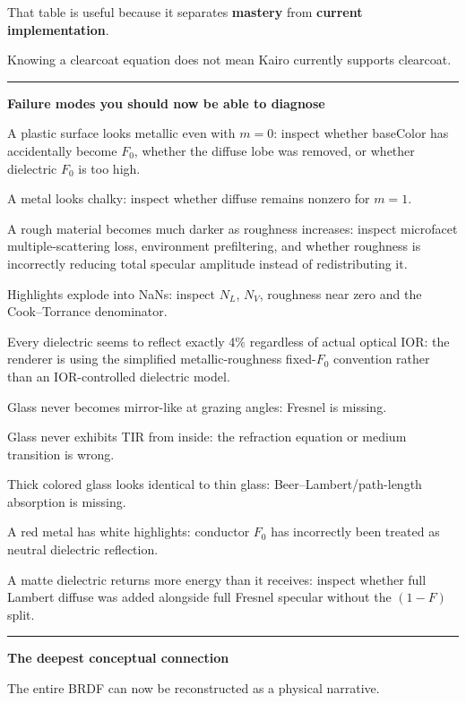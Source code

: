 That table is useful because it separates \textbf{mastery} from \textbf{current implementation}.

Knowing a clearcoat equation does not mean Kairo currently supports clearcoat.

\begin{center}\rule{0.5\linewidth}{0.5pt}\end{center}

\textbf{Failure modes you should now be able to diagnose}

A plastic surface looks metallic even with \(m=0\): inspect whether baseColor has accidentally become \(F_0\), whether the diffuse lobe was removed, or whether dielectric \(F_0\) is too high.

A metal looks chalky: inspect whether diffuse remains nonzero for \(m=1\).

A rough material becomes much darker as roughness increases: inspect microfacet multiple-scattering loss, environment prefiltering, and whether roughness is incorrectly reducing total specular amplitude instead of redistributing it.

Highlights explode into NaNs: inspect \(N_L\), \(N_V\), roughness near zero and the Cook--Torrance denominator.

Every dielectric seems to reflect exactly 4\% regardless of actual optical IOR: the renderer is using the simplified metallic-roughness fixed-\(F_0\) convention rather than an IOR-controlled dielectric model.

Glass never becomes mirror-like at grazing angles: Fresnel is missing.

Glass never exhibits TIR from inside: the refraction equation or medium transition is wrong.

Thick colored glass looks identical to thin glass: Beer--Lambert/path-length absorption is missing.

A red metal has white highlights: conductor \(F_0\) has incorrectly been treated as neutral dielectric reflection.

A matte dielectric returns more energy than it receives: inspect whether full Lambert diffuse was added alongside full Fresnel specular without the \((1-F)\) split.

\begin{center}\rule{0.5\linewidth}{0.5pt}\end{center}

\textbf{The deepest conceptual connection}

The entire BRDF can now be reconstructed as a physical narrative.

